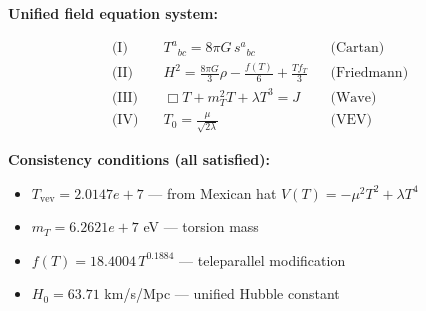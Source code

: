 
\textbf{Unified field equation system:}

\begin{align}
  \text{(I)} \quad & T^a{}_{bc} = 8\pi G \, s^a{}_{bc} && \text{(Cartan)} \\
  \text{(II)} \quad & H^2 = \frac{8\pi G}{3}\rho - \frac{f(T)}{6} + \frac{Tf_T}{3} && \text{(Friedmann)} \\
  \text{(III)} \quad & \Box T + m_T^2 T + \lambda T^3 = J && \text{(Wave)} \\
  \text{(IV)} \quad & T_0 = \frac{\mu}{\sqrt{2\lambda}} && \text{(VEV)}
\end{align}

\textbf{Consistency conditions (all satisfied):}
\begin{itemize}
  \item $T_{\text{vev}} = 2.0147e+7$ — from Mexican hat $V(T) = -\mu^2 T^2 + \lambda T^4$
  \item $m_T = 6.2621e+7$ eV — torsion mass
  \item $f(T) = 18.4004 \, T^{0.1884}$ — teleparallel modification
  \item $H_0 = 63.71$ km/s/Mpc — unified Hubble constant
\end{itemize}